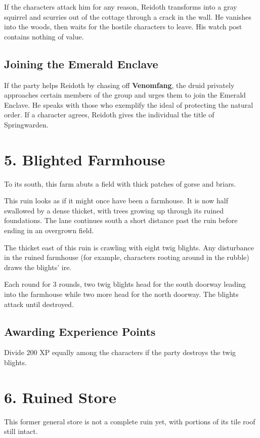 \documentclass[10pt,a4paper,twoside,bg=print,twocolumn,openany,nodeprecatedcode]{dndbook}
\begin{document}
If the characters attack him for any reason, Reidoth transforms into a gray squirrel and scurries out of the cottage through a crack in the wall. He vanishes into the woods, then waits for the hostile characters to leave. His watch post contains nothing of value.

\subsection{Joining the Emerald Enclave}
If the party helps Reidoth by chasing off \textbf{Venomfang}, the druid privately approaches certain members of the group and urges them to join the Emerald Enclave. He speaks with those who exemplify the ideal of protecting the natural order. If a character agrees, Reidoth gives the individual the title of Springwarden.

\section{5. Blighted Farmhouse}
To its south, this farm abuts a field with thick patches of gorse and briars.

\begin{DndReadAloud}{}
This ruin looks as if it might once have been a farmhouse. It is now half swallowed by a dense thicket, with trees growing up through its ruined foundations. The lane continues south a short distance past the ruin before ending in an overgrown field.

\end{DndReadAloud}

The thicket east of this ruin is crawling with eight twig blights. Any disturbance in the ruined farmhouse (for example, characters rooting around in the rubble) draws the blights' ire.

Each round for 3 rounds, two twig blights head for the south doorway leading into the farmhouse while two more head for the north doorway. The blights attack until destroyed.

\subsection{Awarding Experience Points}
Divide 200 XP equally among the characters if the party destroys the twig blights.

\section{6. Ruined Store}
This former general store is not a complete ruin yet, with portions of its tile roof still intact.
\end{document}
